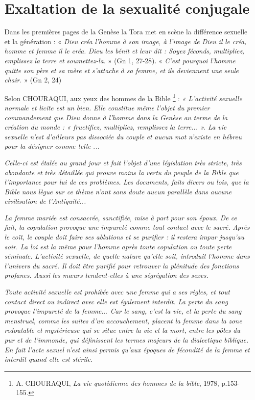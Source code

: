 \section{Exaltation de la sexualité conjugale}

 Dans les premières pages de la Genèse la Tora met en scène la différence sexuelle et la génération : « \emph{Dieu créa l'homme à son image, à l'image de Dieu il le créa, homme et femme il le créa. Dieu les bénit et leur dit : Soyez féconds, multipliez, emplissez la terre et soumettez-la.} » (Gn 1, 27-28). « \emph{C'est pourquoi l'homme quitte son père et sa mère et s'attache à sa femme, et ils deviennent une seule chair.} » (Gn 2, 24)

 Selon CHOURAQUI, aux yeux des hommes de la Bible%
\footnote{A. CHOURAQUI, \emph{La vie quotidienne des hommes de la bible}, 1978, p.153-155.}%
 : \emph{« L'activité sexuelle normale et licite est un bien. Elle constitue même l'objet du premier commandement que Dieu donne à l'homme dans la Genèse au terme de la création du monde : « fructifiez, multipliez, remplissez la terre... ». La vie sexuelle n'est d'ailleurs pas dissociée du couple et aucun mot n'existe en hébreu pour la désigner comme telle ...}

 \emph{Celle-ci est étalée au grand jour et fait l'objet d'une législation très stricte, très abondante et très détaillée qui prouve moins la vertu du peuple de la Bible que l'importance pour lui de ces problèmes. Les documents, faits divers ou lois, que la Bible nous lègue sur ce thème n'ont sans doute aucun parallèle dans aucune civilisation de l'Antiquité...}

 \emph{La femme mariée est consacrée, sanctifiée, mise à part pour son époux. De ce fait, la copulation provoque une impureté comme tout contact avec le sacré. Après le coït, le couple doit faire ses ablutions et se purifier : il restera impur jusqu'au soir. La loi est la même pour l'homme après toute copulation ou toute perte séminale. L'activité sexuelle, de quelle nature qu'elle soit, introduit l'homme dans l'univers du sacré. Il doit être purifié pour retrouver la plénitude des fonctions profanes. Aussi les mœurs tendent-elles à une ségrégation des sexes.}

 \emph{Toute activité sexuelle est prohibée avec une femme qui a ses règles, et tout contact direct ou indirect avec elle est également interdit. La perte du sang provoque l'impureté de la femme... Car le sang, c'est la vie, et la perte du sang menstruel, comme les suites d'un accouchement, placent la femme dans la zone redoutable et mystérieuse qui se situe entre la vie et la mort, entre les pôles du pur et de l'immonde, qui définissent les termes majeurs de la dialectique biblique. En fait l'acte sexuel n'est ainsi permis qu'aux époques de fécondité de la femme et interdit quand elle est stérile.}

